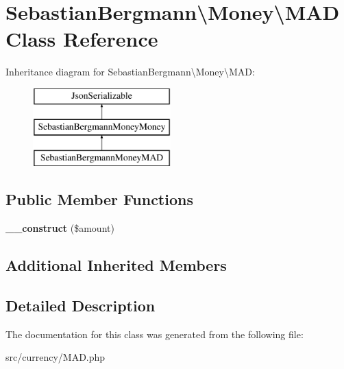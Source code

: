 \hypertarget{classSebastianBergmann_1_1Money_1_1MAD}{}\section{Sebastian\+Bergmann\textbackslash{}Money\textbackslash{}M\+A\+D Class Reference}
\label{classSebastianBergmann_1_1Money_1_1MAD}
Inheritance diagram for Sebastian\+Bergmann\textbackslash{}Money\textbackslash{}M\+A\+D\+:\begin{figure}[H]
\begin{center}
\leavevmode
\includegraphics[height=3.000000cm]{classSebastianBergmann_1_1Money_1_1MAD}
\end{center}
\end{figure}
\subsection*{Public Member Functions}
\begin{DoxyCompactItemize}
\item 
\hypertarget{classSebastianBergmann_1_1Money_1_1MAD_a64653b3e6b5169ebbe5f308eeef2722c}{}{\bfseries \+\_\+\+\_\+construct} (\$amount)\label{classSebastianBergmann_1_1Money_1_1MAD_a64653b3e6b5169ebbe5f308eeef2722c}

\end{DoxyCompactItemize}
\subsection*{Additional Inherited Members}


\subsection{Detailed Description}


The documentation for this class was generated from the following file\+:\begin{DoxyCompactItemize}
\item 
src/currency/M\+A\+D.\+php\end{DoxyCompactItemize}

